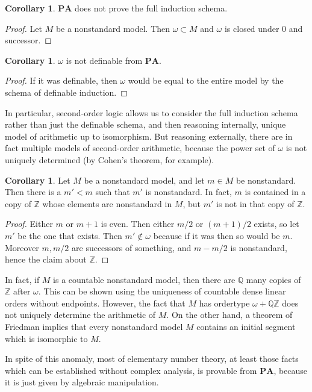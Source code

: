 \documentclass[12pt]{report}
\newcommand{\ZZ}{\mathbb{Z}}
\newcommand{\QQ}{\mathbb{Q}}
\newcommand{\PA}{\mathbf{PA}}
\theoremstyle{definition}
\newtheorem{corollary}[theorem]{Corollary}
\begin{document}
\begin{corollary}
$\PA$ does not prove the full induction schema.
\end{corollary}
\begin{proof}
Let $M$ be a nonstandard model. Then $\omega \subset M$ and $\omega$ is closed under $0$ and successor.
\end{proof}
\begin{corollary}
$\omega$ is not definable from $\PA$.
\end{corollary}
\begin{proof}
If it was definable, then $\omega$ would be equal to the entire model by the schema of definable induction.
\end{proof}
In particular, second-order logic allows us to consider the full induction schema rather than just the definable schema, and then reasoning internally, unique model of arithmetic up to isomorphism.
But reasoning externally, there are in fact multiple models of second-order arithmetic, because the power set of $\omega$ is not uniquely determined (by Cohen's theorem, for example).
\begin{corollary}
Let $M$ be a nonstandard model, and let $m \in M$ be nonstandard. Then there is a $m' < m$ such that $m'$ is nonstandard. In fact, $m$ is contained in a copy of $\ZZ$ whose elements are nonstandard in $M$, but $m'$ is not in that copy of $\ZZ$.
\end{corollary}
\begin{proof}
Either $m$ or $m+1$ is even. Then either $m/2$ or $(m+1)/2$ exists, so let $m'$ be the one that exists. Then $m' \notin \omega$ because if it was then so would be $m$.
Moreover $m,m/2$ are successors of something, and $m-m/2$ is nonstandard, hence the claim about $\ZZ$.
\end{proof}
In fact, if $M$ is a countable nonstandard model, then there are $\QQ$ many copies of $\ZZ$ after $\omega$. This can be shown using the uniqueness of countable dense linear orders without endpoints.
However, the fact that $M$ has ordertype $\omega + \QQ\ZZ$ does not uniquely determine the arithmetic of $M$.
On the other hand, a theorem of Friedman implies that every nonstandard model $M$ contains an initial segment which is isomorphic to $M$.

In spite of this anomaly, most of elementary number theory, at least those facts which can be established without complex analysis, is provable from $\PA$, because it is just given by algebraic manipulation.
\end{document}
